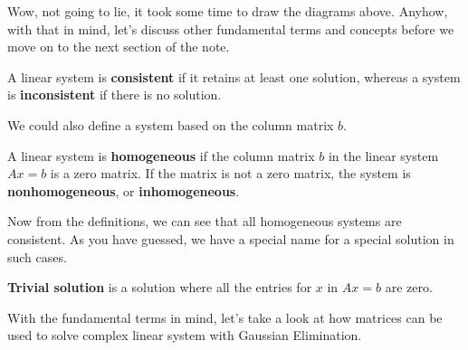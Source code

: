 \documentclass[../../../main.tex]{subfiles}
\begin{document}
\begin{minipage}{0.48\textwidth}
\end{minipage}

Wow, not going to lie, it took some time to draw the diagrams above.
Anyhow, with that in mind, let's discuss other fundamental terms
and concepts before we move on to the next section of the note.

\begin{definition}{}{}
A linear system is \textbf{consistent} if it retains at least one
solution, whereas a system is \textbf{inconsistent} if there is no
solution.
\end{definition}

We could also define a system based on the column matrix $b$.

\begin{definition}{}{}
A linear system is \textbf{homogeneous} if the column matrix $b$
in the linear system $Ax = b$ is a zero matrix. If the matrix is not
a zero matrix, the system is \textbf{nonhomogeneous}, or
\textbf{inhomogeneous}.
\end{definition}

Now from the definitions, we can see that all homogeneous systems
are consistent. As you have guessed, we have a special name for
a special solution in such cases.

\begin{definition}{}{}
\textbf{Trivial solution} is a solution where all the entries for
$x$ in $Ax = b$ are zero.
\end{definition}

With the fundamental terms in mind, let's take a look at how matrices
can be used to solve complex linear system with Gaussian Elimination.
\end{document}
